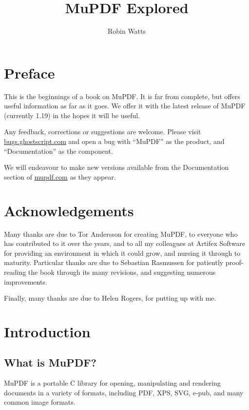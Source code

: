 \documentclass[oneside]{book}
\begin{document}
\title{MuPDF Explored}
\author{Robin Watts}

\maketitle

\frontmatter

\chapter{Preface}

This is the beginnings of a book on MuPDF. It is far from complete, but offers useful information as far as it goes. We offer it with the latest release of MuPDF (currently 1.19) in the hopes it will be useful.

Any feedback, corrections or suggestions are welcome. Please visit \url{bugs.ghostscript.com} and open a bug with ``MuPDF'' as the product, and ``Documentation'' as the component.

We will endeavour to make new versions available from the Documentation section of \url{mupdf.com} as they appear.


\chapter{Acknowledgements}

Many thanks are due to Tor Andersson for creating MuPDF, to everyone who has contributed to it over the years, and to all my colleagues at Artifex Software for providing an environment in which it could grow, and nursing it through to maturity. Particular thanks are due to Sebastian Rasmussen for patiently proof-reading the book through its many revisions, and suggesting numerous improvements.

Finally, many thanks are due to Helen Rogers, for putting up with me.

\tableofcontents

\mainmatter

\chapter{Introduction}
\label{Introduction}


\section{What is MuPDF?}

MuPDF is a portable C library for opening, manipulating and rendering documents in a variety of formats, including PDF, XPS, SVG, e-pub, and many common image formats.
\end{document}
